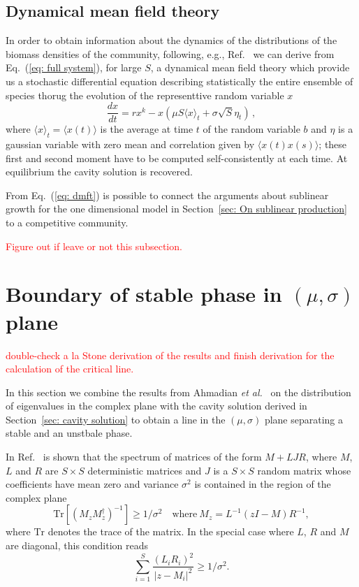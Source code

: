 \documentclass[10pt]{article}
\begin{document}
\subsection{Dynamical mean field theory}
In order to obtain information about the dynamics
of the distributions of the biomass densities of the community,
following, e.g., Ref.~\cite{Roy2019} we can derive
from Eq.~(\ref{eq: full system}), for large $S$, 
a dynamical mean field theory which provide us a stochastic differential
equation describing statistically the entire ensemble of species
thorug the evolution of the representtive random variable $x$
\begin{equation}
    \frac{d x}{dt} = rx^k -
     x\left(\mu S \langle x \rangle_t + \sigma \sqrt{S} \eta_t \right)\, ,
\label{eq: dmft}
\end{equation}
where $\langle x\rangle_t=\langle x(t)\rangle$ is the average at time $t$ of the random variable
$b$ and $\eta$ is a gaussian variable
with zero mean and correlation given by $\langle x(t)x(s)\rangle$; these first and
second moment have to be computed self-consistently at each time. 
At equilibrium the cavity solution is recovered.

From Eq.~(\ref{eq: dmft}) is possible to connect the arguments about
sublinear growth for the one dimensional model in 
Section~\ref{sec: On sublinear production}
to a competitive community.

\textcolor{red}{Figure out if leave or not this subsection.}


\section{Boundary of stable phase in $(\mu, \sigma)$ plane}
\textcolor{red}{double-check a la Stone 
derivation of the results and finish derivation for the
calculation of the critical line.}

In this section we combine the results from Ahmadian \emph{et al.}~\cite{Ahmadian2015} 
on the distribution of eigenvalues
in the complex plane with the cavity solution derived in 
Section~\ref{sec: cavity solution} to obtain a line in the $(\mu, \sigma)$
plane separating a stable and an unstbale phase.

In Ref.~\cite{Ahmadian2015} is shown that the spectrum of matrices of the form 
$M + LJR$, where $M$,  $L$ and $R$ are $S\times S$ deterministic matrices and $J$ 
is a $S\times S$ random matrix whose coefficients have mean zero and variance $\sigma^2$ 
is contained in the region of the complex plane 
\begin{equation}
    \textrm{Tr}[(M_zM_z^\dagger)^{-1}]\geq 1/\sigma^2 \quad \textrm{where}\ M_z = L^{-1}(zI - M)R^{-1}, 
\end{equation}
where $\textrm{Tr}$ denotes the trace of the matrix. In the special case where 
$L$, $R$ and $M$ are diagonal, this condition reads
\begin{equation}
    \sum_{i=1}^S\frac{(L_{i}R_{i})^2}{ \vert z - M_{i}\vert^2 }\geq 1/\sigma^2.
\end{equation}
\end{document}
